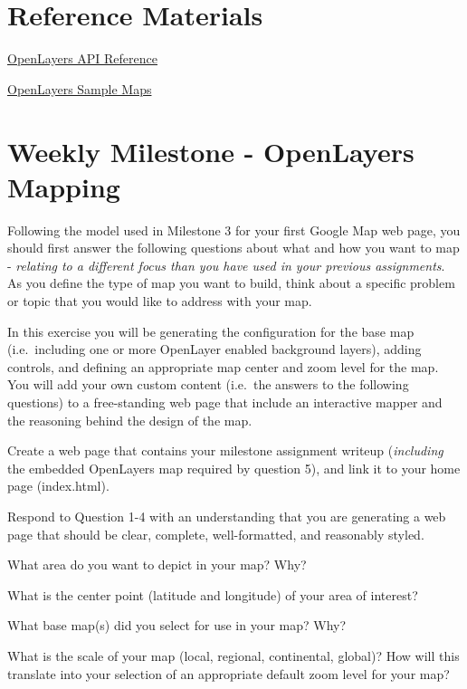 \documentclass[]{book}
\providecommand{\tightlist}{%
  \setlength{\itemsep}{0pt}\setlength{\parskip}{0pt}}
\begin{document}
\section{Reference Materials}\label{week10-reference}

\href{http://openlayers.org/en/v3.14.2/apidoc/}{OpenLayers API
Reference}

\href{http://openlayers.org/en/v3.2.1/examples/}{OpenLayers Sample Maps}

\section{Weekly Milestone - OpenLayers Mapping}\label{week10-milestone}

Following the model used in Milestone 3 for your first Google Map web
page, you should first answer the following questions about what and how
you want to map - \emph{relating to a different focus than you have used
in your previous assignments}. As you define the type of map you want to
build, think about a specific problem or topic that you would like to
address with your map.

In this exercise you will be generating the configuration for the base
map (i.e.~including one or more OpenLayer enabled background layers),
adding controls, and defining an appropriate map center and zoom level
for the map. You will add your own custom content (i.e.~the answers to
the following questions) to a free-standing web page that include an
interactive mapper and the reasoning behind the design of the map.

Create a web page that contains your milestone assignment writeup
(\emph{including} the embedded OpenLayers map required by question 5),
and link it to your home page (index.html).

Respond to Question 1-4 with an understanding that you are generating a
web page that should be clear, complete, well-formatted, and reasonably
styled.

\begin{description}
\tightlist
\item[Question 1]
What area do you want to depict in your map? Why?
\item[Question 2]
What is the center point (latitude and longitude) of your area of
interest?
\item[Question 3]
What base map(s) did you select for use in your map? Why?
\item[Question 4]
What is the scale of your map (local, regional, continental, global)?
How will this translate into your selection of an appropriate default
zoom level for your map?
\end{description}
\end{document}

